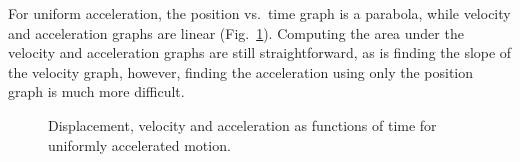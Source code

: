 \documentclass{../../oss-handout}
\begin{document}
For uniform acceleration, the position vs.\ time graph is a parabola, while
velocity and acceleration graphs are linear (Fig.~\ref{uniform-acceleration}).
Computing the area under the velocity and acceleration graphs are still
straightforward, as is finding the slope of the velocity graph, however,
finding the acceleration using only the position graph is much more difficult.
\begin{figure}[!ht]
  \centering
  \hspace{.15in}
  \hspace{.15in}
  \caption{Displacement, velocity and acceleration as functions of time for
    uniformly accelerated motion.}
  \label{uniform-acceleration}
\end{figure}
\end{document}
